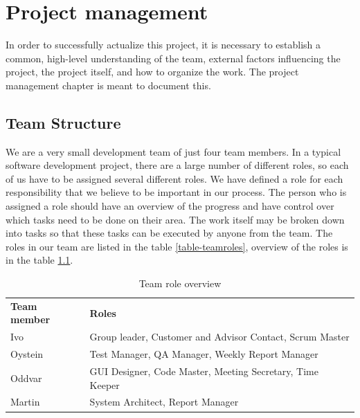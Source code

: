 \chapter{Project management}

\minitoc

In order to successfully actualize this project, it is necessary to establish a common, high-level understanding of the team, external factors influencing the project, the project itself, and how to organize the work. The project management chapter is meant to document this.

\clearpage

\section{Team Structure}
We are a very small development team of just four team members. In a typical software development project, there are a large number of different roles, so each of us have to be assigned several different roles. We have defined a role for each responsibility that we believe to be important in our process. The person who is assigned a role should have an overview of the progress and have control over which tasks need to be done on their area. The work itself may be broken down into tasks so that these tasks can be executed by anyone from the team. The roles in our team are listed in the table \ref{table-teamroles}, overview of the roles is in the table \ref{table-rolesoverview}.

\begin{table}
\centering
\begin{tabular}{ l  l }
  \hline
  \textbf{Team member} & \textbf{Roles} \\
  Ivo & Group leader, Customer and Advisor Contact, Scrum Master \\
  Oystein & Test Manager, QA Manager, Weekly Report Manager \\
  Oddvar & GUI Designer, Code Master, Meeting Secretary, Time Keeper \\
  Martin & System Architect, Report Manager \\
  \hline
\end{tabular}
\label{table-rolesoverview}
\caption{Team role overview}
\end{table}



